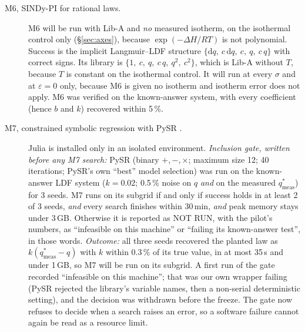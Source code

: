 \documentclass[11pt]{article}
\newcommand{\qsm}{q^{*}_{\mathrm{meas}}}
\begin{document}
\begin{description}
\item[M6, SINDy-PI \citep{kaheman2020} for rational laws.] M6 will be run with Lib-A and
\emph{no} measured isotherm, on the isothermal control only (\S\ref{sec:axes}), because
$\exp(-\Delta H/RT)$ is not polynomial. Success is the implicit Langmuir--LDF structure
$\{\mathrm{d}q,\ c\,\mathrm{d}q,\ c,\ q,\ c\,q\}$ with correct signs. Its library is
$\{1,\ c,\ q,\ c\,q,\ q^{2},\ c^{2}\}$, which is Lib-A without $T$, because $T$ is constant
on the isothermal control. It will run at every $\sigma$ and at $\varepsilon = 0$ only,
because M6 is given no isotherm and isotherm error does not apply. M6 was verified on the
known-answer system, with every coefficient (hence $b$ and $k$) recovered within 5\,\%.

\item[M7, constrained symbolic regression with PySR \citep{cranmer2023}.] Julia is
installed only in an isolated environment. \emph{Inclusion gate, written before any M7
search:} PySR (binary $+,-,\times$; maximum size 12; 40 iterations; PySR's own ``best''
model selection) was run on the known-answer LDF system ($k = 0.02$; 0.5\,\% noise on $q$
\emph{and} on the measured $\qsm$) for 3 seeds. M7 runs on its subgrid if and only if
success holds in at least 2 of 3 seeds, \emph{and} every search finishes within 30\,min,
\emph{and} peak memory stays under 3\,GB. Otherwise it is reported as NOT RUN, with the
pilot's numbers, as ``infeasible on this machine'' or ``failing its known-answer test'',
in those words. \emph{Outcome:} all three seeds recovered the planted law as $k(\qsm - q)$
with $k$ within 0.3\,\% of its true value, in at most 35\,s and under 1\,GB, so M7 will be
run on its subgrid. A first run of the gate recorded ``infeasible on this machine''; that
was our own wrapper failing (PySR rejected the library's variable names, then a non-serial
deterministic setting), and the decision was withdrawn before the freeze. The gate now
refuses to decide when a search raises an error, so a software failure cannot again be read
as a resource limit.


\end{description}
\end{document}
